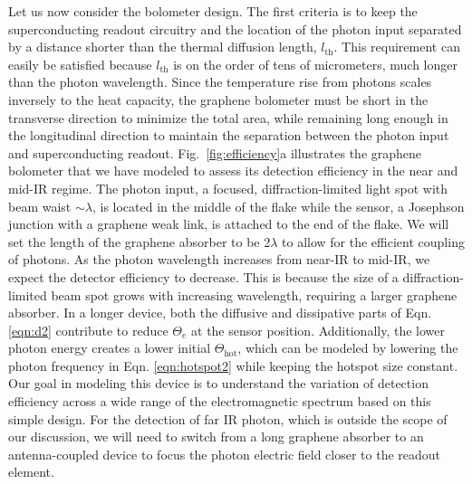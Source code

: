 \documentclass[aip, amsmath,amssymb, reprint]{revtex4-1}
\begin{document}
Let us now consider the bolometer design. The first criteria is to keep the superconducting readout circuitry and the location of the photon input separated by a distance shorter than the thermal diffusion length, $l_{\text{th}}$. This requirement can easily be satisfied because $l_{\text{th}}$ is on the order of tens of micrometers, much longer than the photon wavelength. Since the temperature rise from photons scales inversely to the heat capacity, the graphene bolometer must be short in the transverse direction to minimize the total area, while remaining long enough in the longitudinal direction to maintain the separation between the photon input and superconducting readout. Fig.~\ref{fig:efficiency}a illustrates the graphene bolometer that we have modeled to assess its detection efficiency in the near and mid-IR regime. The photon input, a focused, diffraction-limited light spot with beam waist $\sim\lambda$, is located in the middle of the flake while the sensor, a Josephson junction with a graphene weak link, is attached to the end of the flake. We will set the length of the graphene absorber to be 2$\lambda$ to allow for the efficient coupling of photons\cite{Efetov.2018,Ye.2021}. As the photon wavelength increases from near-IR to mid-IR, we expect the detector efficiency to decrease. This is because the size of a diffraction-limited beam spot grows with increasing wavelength, requiring a larger graphene absorber. In a longer device, both the diffusive and dissipative parts of Eqn. \ref{eqn:d2} contribute to reduce $\Theta_e$ at the sensor position. Additionally, the lower photon energy creates a lower initial $\Theta_{\text{hot}}$, which can be modeled by lowering the photon frequency in Eqn. \ref{eqn:hotspot2} while keeping the hotspot size constant. Our goal in modeling this device is to understand the variation of detection efficiency across a wide range of the electromagnetic spectrum based on this simple design. For the detection of far IR photon, which is outside the scope of our discussion, we will need to switch from a long graphene absorber to an antenna-coupled device to focus the photon electric field closer to the readout element\cite{Castilla.2019}.
\end{document}

